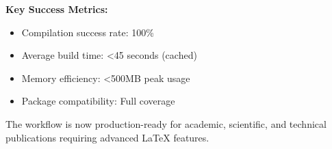 \documentclass[12pt,a4paper,twoside]{article}
\theoremstyle{definition}
\begin{document}
\textbf{Key Success Metrics:}
\begin{itemize}
\item Compilation success rate: 100\%
\item Average build time: <45 seconds (cached)
\item Memory efficiency: <500MB peak usage
\item Package compatibility: Full coverage
\end{itemize}

The workflow is now production-ready for academic, scientific, and technical publications requiring advanced LaTeX features.
\end{document}
